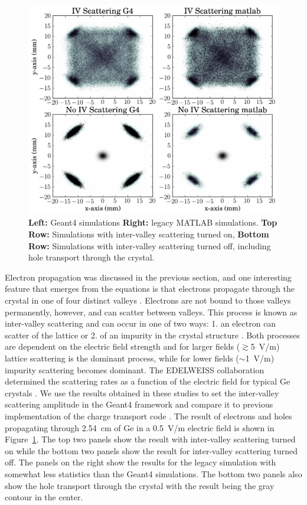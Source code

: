 
\begin{figure}
	\centering
		\includegraphics[width=1.0\textwidth]{intervalley.png}
	\caption{\textbf{Left:} Geant4 simulations \textbf{Right:} legacy MATLAB simulations. \textbf{Top Row:} Simulations with inter-valley scattering turned on, \textbf{Bottom Row:} Simulations with inter-valley scattering turned off, including hole transport through the crystal.}
	\label{fig:intervalley}
\end{figure}

Electron propagation was discussed in the previous section, and one interesting feature that emerges from the equations is that electrons propagate through the crystal in one of four distinct valleys \cite{Cabrera,Leman}. Electrons are not bound to those valleys permanently, however, and can scatter between valleys. This process is known as inter-valley scattering and can occur in one of two ways: 1. an electron can scatter of the lattice or 2. of an impurity in the crystal structure \cite{iv}. Both processes are dependent on the electric field strength and for larger fields ($\gtrsim$5~V/m) lattice scattering is the dominant process, while for lower fields ($\sim$1~V/m) impurity scattering becomes dominant. The EDELWEISS \cite{edelweiss} collaboration determined the scattering rates as a function of the electric field for typical Ge crystals \cite{iv}. We use the results obtained in these studies to set the inter-valley scattering amplitude in the Geant4 framework and compare it to previous implementation of the charge transport code \cite{Cabrera,Leman}. The result of electrons and holes propagating through 2.54~cm of Ge in a 0.5~V/m electric field is shown in Figure~\ref{fig:intervalley}. The top two panels show the result with inter-valley scattering turned on while the bottom two panels show the result for inter-valley scattering turned off. The panels on the right show the results for the legacy simulation \cite{Cabrera,Leman} with somewhat less statistics than the Geant4 simulations. The bottom two panels also show the hole transport through the crystal with the result being the gray contour in the center. 
